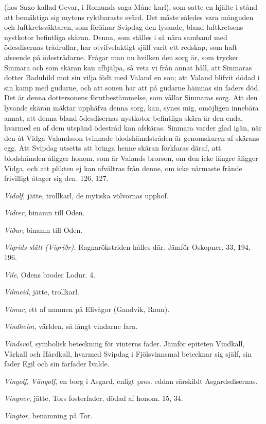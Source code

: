 (hos Saxo kallad Gevar, i Romunds saga Måne karl), som satte en hjälte i
stånd att bemäktiga sig mytens ryktbaraste svärd. Det måste således vara
månguden och luftkretsväktaren, som förlänar Svipdag den lysande, bland
luftkretsens nystkotor befintliga skäran. Denna, som ställes i så nära
samband med ödesdisernas trådrullar, har otvifvelaktigt själf varit ett
redskap, som haft afseende på ödestrådarne. Frågar man nu hvilken den
sorg är, som trycker Sinmara och som skäran kan afhjälpa, så veta vi
från annat håll, att Sinmaras dotter Baduhild mot sin vilja födt med
Valand en son; att Valand blifvit dödad i sin kamp med gudarne, och att
sonen har att på gudarne hämnas sin faders död. Det är denna
dottersonens förutbestämmelse, som vållar Sinmaras sorg. Att den lysande
skäran mäktar upphäfva denna sorg, kan, synes mig, omöjligen innebära
annat, att denna bland ödesdisernas nystkotor befintliga skära är den
enda, hvarmed en af dem utspänd ödestråd kan afskäras. Sinmara varder
glad igän, när den åt Vidga Valandsson tvinnade blodshämdstråden är
genomskuren af skärans egg. Att Svipdag utsetts att bringa henne skäran
förklaras däraf, att blodshämden åligger honom, som är Valands brorson,
om den icke längre åligger Vidga, och att plikten ej kan afvältras från
denne, om icke närmaste frände frivilligt åtager sig den. 126, 127.

\emph{Vidolf}, jätte, trollkarl, de mytiska völvornas upphof.

\emph{Vidrer}, binamn till Oden.

\emph{Viður}, binamn till Oden.

\emph{Vigrids slätt (Vígríðr).} Ragnarökstriden hålles där. Jämför
Oskopner. 33, 194, 196.

\emph{Vile}, Odens broder Lodur. 4.

\emph{Vilmeid}, jätte, trollkarl.

\emph{Vimur}, ett af namnen på Elivågor (Gandvik, Raun).

\emph{Vindheim}, världen, så långt vindarne fara.

\emph{Vindsval}, symbolisk beteckning för vinterns fader. Jämför
epiteten Vindkall, Vårkall och Hårdkall, hvarmed Svipdag i Fjölsvinnsmal
betecknar sig själf, sin fader Egil och sin farfader Ivalde.

\emph{Vingolf, Vängolf}, en borg i Asgard, enligt pros. eddan särskildt
Asgardsdisernas.

\emph{Vingner}, jätte, Tors fosterfader, dödad af honom. 15, 34.

\emph{Vingtor}, benämning på Tor.

